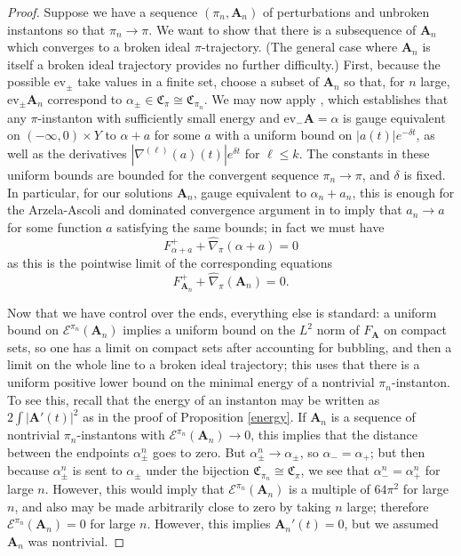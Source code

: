 \documentclass{memo-l}
\theoremstyle{definition}
\theoremstyle{remark}
\numberwithin{section}{chapter}
\numberwithin{equation}{chapter}
\begin{document}
\begin{proof}Suppose we have a sequence $(\pi_n, \mathbf{A}_n)$ of perturbations and unbroken instantons so that $\pi_n \to \pi$. We want to show that there is a subsequence of $\mathbf{A}_n$ which converges to a broken ideal $\pi$-trajectory. (The general case where $\mathbf{A}_n$ is itself a broken ideal trajectory provides no further difficulty.) First, because the possible $\text{ev}_\pm$ take values in a finite set, choose a subset of $\mathbf{A}_n$ so that, for $n$ large, $\text{ev}_\pm \mathbf{A}_n$ correspond to $\alpha_\pm \in \mathfrak C_\pi \cong \mathfrak C_{\pi_n}$. We may now apply \cite[Lemma~4.3]{Don}, which establishes that any $\pi$-instanton with sufficiently small energy and $\text{ev}_- \mathbf{A} = \alpha$ is gauge equivalent on $(-\infty, 0) \times Y$ to $\alpha + a$ for some $a$ with a uniform bound on $|a(t)| e^{-\delta t}$, as well as the derivatives $|\nabla^{(\ell)}(a)(t)| e^{\delta t}$ for $\ell \leq k$. The constants in these uniform bounds are bounded for the convergent sequence $\pi_n \to \pi$, and $\delta$ is fixed. In particular, for our solutions $\mathbf{A}_n$, gauge equivalent to $\alpha_n + a_n$, this is enough for the Arzela-Ascoli and dominated convergence argument in \cite[Lemma~5.1]{Don} to imply that $a_n \to a$ for some function $a$ satisfying the same bounds; in fact we must have 
$$F_{\alpha + a}^+ + \widehat{\nabla}_\pi(\alpha+a) = 0$$ 
as this is the pointwise limit of the corresponding equations 
$$F_{\mathbf{A}_n}^+ + \widehat{\nabla}_\pi(\mathbf{A}_n) = 0.$$

Now that we have control over the ends, everything else is standard: a uniform bound on $\mathcal E^{\pi_n}(\mathbf{A}_n)$ implies a uniform bound on the $L^2$ norm of $F_{\mathbf{A}}$ on compact sets, so one has a limit on compact sets after accounting for bubbling, and then a limit on the whole line to a broken ideal trajectory; this uses that there is a uniform positive lower bound on the minimal energy of a nontrivial $\pi_n$-instanton. To see this, recall that the energy of an instanton may be written as $2\int |\mathbf{A}'(t)|^2$ as in the proof of Proposition \ref{energy}. If $\mathbf{A}_n$ is a sequence of nontrivial $\pi_n$-instantons with $\mathcal E^{\pi_n}(\mathbf{A}_n) \to 0$, this implies that the distance between the endpoints $\alpha_\pm^n$ goes to zero. But $\alpha_{\pm}^n \to \alpha_\pm$, so $\alpha_- = \alpha_+$; but then because $\alpha^n_\pm$ is sent to $\alpha_\pm$ under the bijection $\mathfrak C_{\pi_n} \cong \mathfrak C_{\pi}$, we see that $\alpha_-^n = \alpha_+^n$ for large $n$. However, this would imply that $\mathcal E^{\pi_n}(\mathbf{A}_n)$ is a multiple of $64\pi^2$ for large $n$, and also may be made arbitrarily close to zero by taking $n$ large; therefore $\mathcal E^{\pi_n}(\mathbf{A}_n) = 0$ for large $n$. However, this implies $\mathbf{A}_n'(t) = 0$, but we assumed $\mathbf{A}_n$ was nontrivial.


\end{proof}
\end{document}
